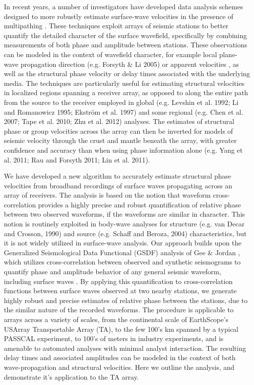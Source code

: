 \documentclass[referee]{gji}
\begin{document}
In recent years, a number of investigators have developed data analysis schemes designed to more robustly estimate surface-wave velocities in the presence of multipathing \cite{Friederich:1995ce,Forsyth:2005aa,Yang:2006fc,Lin:2009fx,Lin:2011fw,Yang:2011sw}.  These techniques exploit arrays of seismic stations to better quantify the detailed character of the surface wavefield, specifically by combining measurements of both phase and amplitude between stations.  These observations can be modeled in the context of wavefield character, for example local plane-wave propagation direction (e.g. Forsyth \& Li 2005) or apparent velocities \cite{Lin:2009fx}, as well as the structural phase velocity or delay times associated with the underlying media. The techniques are particularly useful for estimating structural velocities in localized regions spanning a receiver array, as opposed to along the entire path from the source to the receiver employed in global (e.g. Levshin et al. 1992; Li and Romanowicz 1995; Ekstr\"{o}m et al. 1997) and some regional (e.g. Chen et al. 2007; Tape et al. 2010; Zhu et al. 2012) analyses.  The estimates of structural phase or group velocities across the array can then be inverted for models of seismic velocity through the crust and mantle beneath the array, with greater confidence and accuracy than when using phase information alone (e.g. Yang et al. 2011; Rau and Forsyth 2011; Lin et al. 2011).

We have developed a new algorithm to accurately estimate structural phase velocities from broadband recordings of surface waves propagating across an array of receivers.  The analysis is based on the notion that waveform cross-correlation provides a highly precise and robust quantification of relative phase between two observed waveforms, if the waveforms are similar in character.  This notion is routinely exploited in body-wave analyses for structure (e.g. van Decar and Crosson, 1990) and source (e.g. Schaff and Beroza, 2004) characteristics, but it is not widely utilized in surface-wave analysis.  Our approach builds upon the Generalized Seismological Data Functional (GSDF) analysis of Gee \& Jordan , which utilizes cross-correlation between observed and synthetic seismograms to quantify phase and amplitude behavior of any general seismic waveform, including surface waves \cite{Gaherty:1995ld,Gaherty:1996ss,Gaherty:2004sw,Chen:2007ft,Chen:2007f3}.  By applying this quantification to cross-correlation functions between surface waves observed at two nearby stations, we generate highly robust and precise estimates of relative phase between the stations, due to the similar nature of the recorded waveforms.  The procedure is applicable to arrays across a variety of scales, from the continental scale of EarthScope's USArray Transportable Array (TA), to the few 100's km spanned by a typical PASSCAL experiment, to 100's of meters in industry experiments, and is amenable to automated analyses with minimal analyst interaction.  The resulting delay times and associated amplitudes can be modeled in the context of both wave-propagation and structural velocities.  Here we outline the analysis, and demonstrate it's application to the TA array.   
\end{document}
